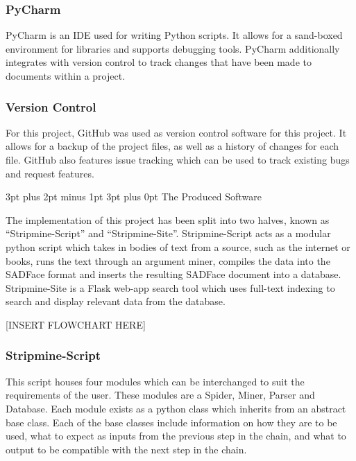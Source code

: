 \documentclass[12pt,a4paper]{article}
\makeatletter
\renewcommand\subsection{\@startsection {subsection}{1}{2mm} %
                               {3pt plus 2pt minus 1pt} %
                               {3pt plus 0pt} %
                               {\normalfont\bfseries}}
\makeatother
\begin{document}
\subsubsection{PyCharm}

PyCharm is an IDE used for writing Python scripts. It allows for a sand-boxed environment for libraries and supports debugging tools. PyCharm additionally integrates with version control to track changes that have been made to documents within a project. 

\subsubsection{Version Control}

For this project, GitHub was used as version control software for this project. It allows for a backup of the project files, as well as a history of changes for each file. GitHub also features issue tracking which can be used to track existing bugs and request features.

\subsection{The Produced Software}

The implementation of this project has been split into two halves, known as ``Stripmine-Script'' and ``Stripmine-Site''. Stripmine-Script acts as a modular python script which takes in bodies of text from a source, such as the internet or books, runs the text through an argument miner, compiles the data into the SADFace format and inserts the resulting SADFace document into a database. Stripmine-Site is a Flask web-app search tool which uses full-text indexing to search and display relevant data from the database.\newline

[INSERT FLOWCHART HERE]\newline

\subsubsection{Stripmine-Script}

This script houses four modules which can be interchanged to suit the requirements of the user. These modules are a Spider, Miner, Parser and Database. Each module exists as a python class which inherits from an abstract base class. Each of the base classes include information on how they are to be used, what to expect as inputs from the previous step in the chain, and what to output to be compatible with the next step in the chain. 
\end{document}
